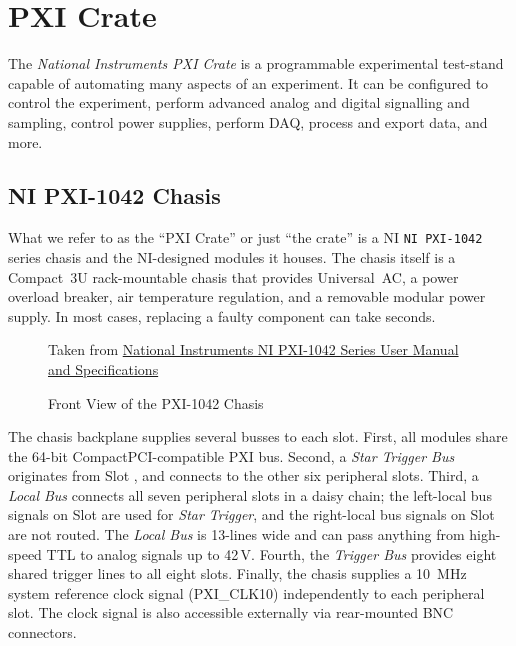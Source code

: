 \section{PXI Crate}
\label{sec:eq_pxi}

The \textit{National Instruments \gls{PXI Crate}} is a programmable experimental test-stand capable of automating many aspects of an experiment.  It can be configured to control the experiment, perform advanced analog and digital signalling and sampling, control power supplies, perform \gls{DAQ}, process and export data, and more.

\subsection{NI PXI-1042 Chasis}
\label{sec:eq_pxi:chasis}

What we refer to as the ``PXI Crate'' or just ``the crate'' is a \gls{NI} \texttt{NI PXI-1042} series chasis and the \gls{NI}-designed modules it houses.  The chasis itself is a Compact~3U rack-mountable chasis that provides Universal~AC, a power overload breaker, air temperature regulation, and a removable modular power supply.  In most cases, replacing a faulty component can take seconds.

\begin{figure}[htbp]
  \centering
  {\tiny
    Taken from \href{Manuals/NI PXI-1042 Series User Manual and Specifications}{National Instruments NI PXI-1042 Series User Manual and Specifications}
  }
  \caption{Front View of the PXI-1042 Chasis}
  \label{fig:eq_pxi:chasis_front}
\end{figure}

The chasis backplane supplies several busses to each slot.  First, all modules share the 64-bit CompactPCI-compatible PXI bus.  Second, a \textit{Star Trigger Bus} originates from Slot \pxislottwo, and connects to the other six peripheral slots.  Third, a \textit{Local Bus} connects all seven peripheral slots in a daisy chain; the left-local bus signals on Slot \pxislottwo{} are used for \textit{Star Trigger}, and the right-local bus signals on Slot  are not routed.  The \textit{Local Bus} is 13-lines wide and can pass anything from high-speed TTL to analog signals up to 42\,V.  Fourth, the \textit{Trigger Bus} provides eight shared trigger lines to all eight slots.  Finally, the chasis supplies a 10~MHz system reference clock signal (PXI\_CLK10) independently to each peripheral slot.  The clock signal is also accessible externally via rear-mounted BNC connectors.

